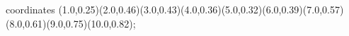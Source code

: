					coordinates { (1.0,0.25)(2.0,0.46)(3.0,0.43)(4.0,0.36)(5.0,0.32)(6.0,0.39)(7.0,0.57)(8.0,0.61)(9.0,0.75)(10.0,0.82)};